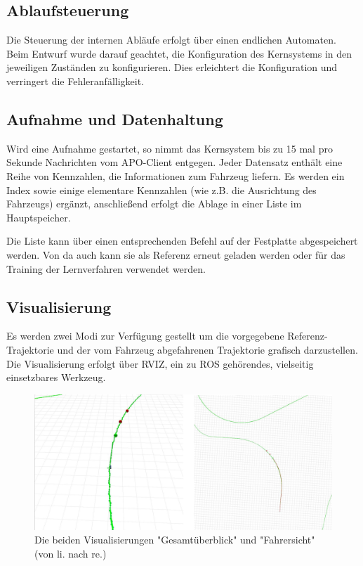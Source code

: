\subsection{Ablaufsteuerung}
\label{subsec:Ablaufsteuerung}
Die Steuerung der internen Abläufe erfolgt über einen endlichen Automaten. Beim Entwurf wurde darauf geachtet, die Konfiguration des Kernsystems in den jeweiligen Zuständen zu konfigurieren. Dies erleichtert die Konfiguration und verringert die Fehleranfälligkeit.

\subsection{Aufnahme und Datenhaltung}
\label{subsec:AufnahmeUndDatenhaltung}
Wird eine Aufnahme gestartet, so nimmt das Kernsystem bis zu 15 mal pro Sekunde Nachrichten vom APO-Client entgegen. Jeder Datensatz enthält eine Reihe von Kennzahlen, die Informationen zum Fahrzeug liefern. Es werden ein Index sowie einige elementare Kennzahlen (wie z.B. die Ausrichtung des Fahrzeugs) ergänzt, anschließend erfolgt die Ablage in einer Liste im Hauptspeicher.

Die Liste kann über einen entsprechenden Befehl auf der Festplatte abgespeichert werden. Von da auch kann sie als Referenz erneut geladen werden oder für das Training der Lernverfahren verwendet werden.

\subsection{Visualisierung}
\label{subsec:Visualisierung}
Es werden zwei Modi zur Verfügung gestellt um die vorgegebene Referenz-Trajektorie und der vom Fahrzeug abgefahrenen Trajektorie grafisch darzustellen. Die Visualisierung erfolgt über RVIZ, ein zu ROS gehörendes, vielseitig einsetzbares Werkzeug.

\begin{figure}[!h]
	\centering
	\includegraphics[scale=1.0]{images/framework/Visualisierungen.png} 
	\caption{Die beiden Visualisierungen "Gesamtüberblick" und "Fahrersicht" (von li. nach re.)}
	\label{fig:Visualisierungen}
\end{figure}

